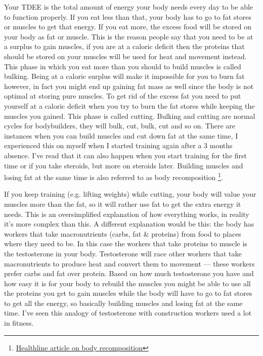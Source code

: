 \documentclass[openany, 12pt]{book}
\begin{document}
	Your TDEE is the total amount of energy your body needs every day to be able to function properly. If you eat less than that, your body has to go to fat stores or muscles to get that energy.
        If you eat more, the excess food will be stored on your body as fat or muscle. This is the reason people say that you need to be at a surplus to gain muscles, if you are at a caloric deficit
        then the proteins that should be stored on your muscles will be used for heat and movement instead. This phase in which you eat more than you should to build muscles is called bulking.
        Being at a caloric surplus will make it impossible for you to burn fat however, in fact you might end up gaining fat mass as well since the body is not optimal at storing pure muscles.
        To get rid of the excess fat you need to put yourself at a caloric deficit when you try to burn the fat stores while keeping the muscles you gained. This phase is called cutting. Bulking
        and cutting are normal cycles for bodybuilders, they will bulk, cut, bulk, cut and so on. There are instances when you can build muscles and cut down fat at the same time, I experienced this on
        myself when I started training again after a 3 months absence. I've read that it can also happen when you start training for the first time or if you take steroids, but more on steroids later.
        Building muscles and losing fat at the same time is also referred to as body recomposition
        \footnote{\href{https://www.healthline.com/nutrition/body-recomposition\#how-it-works}{Healthline article on body recomposition}}.
	
	If you keep training (e.g. lifting weights) while cutting, your body will value your muscles more than the fat, so it will rather use fat to get the extra energy it needs. This is an
        oversimplified explanation of how everything works, in reality it's more complex than this. A different explanation would be this: the body has workers that take macronutrients (carbs, fat \&
        proteins) from food to places where they need to be. In this case the workers that take proteins to muscle is the testosterone in your body. Testosterone will race other workers that take
        macronutrients to produce heat and convert them to movement --- these workers prefer carbs and fat over protein. Based on how much testosterone you have and how easy it is for your body to
        rebuild the muscles you might be able to use all the proteins you get to gain muscles while the body will have to go to fat stores to get all the energy, so basically building muscles and
        losing fat at the same time. I've seen this analogy of testosterone with construction workers used a lot in fitness. 
	
\end{document}
